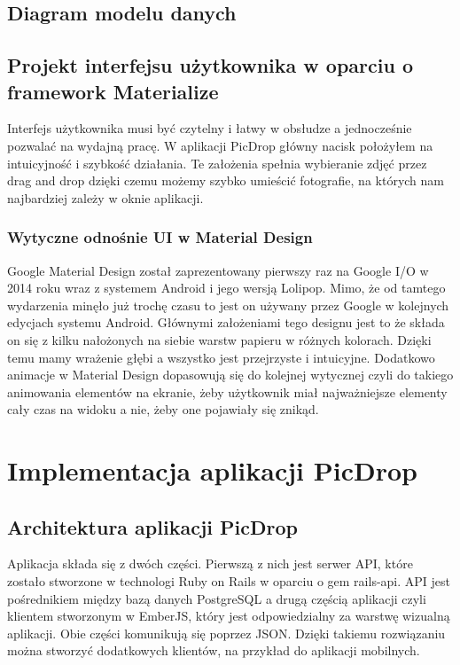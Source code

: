 \documentclass[brudnopis]{xmgr}
\begin{document}
\section{Diagram modelu danych}
\section{Projekt interfejsu użytkownika w oparciu o framework Materialize}
	Interfejs użytkownika musi być czytelny i łatwy w obsłudze a jednocześnie pozwalać na wydajną pracę. W aplikacji PicDrop główny nacisk położyłem na intuicyjność i szybkość działania. Te założenia spełnia wybieranie zdjęć przez drag and drop dzięki czemu możemy szybko umieścić fotografie, na których nam najbardziej zależy w oknie aplikacji.
\subsection{Wytyczne odnośnie UI w Material Design}
Google Material Design został zaprezentowany pierwszy raz na Google I/O w 2014 roku wraz z systemem Android i jego wersją Lolipop. Mimo, że od tamtego wydarzenia minęło już trochę czasu to jest on używany przez Google w kolejnych edycjach systemu Android. Głównymi założeniami tego designu jest to że składa on się z kilku  nałożonych na siebie warstw papieru w różnych kolorach. Dzięki temu mamy wrażenie głębi a wszystko jest przejrzyste i intuicyjne.
Dodatkowo animacje w Material Design dopasowują się do kolejnej wytycznej czyli do takiego animowania elementów na ekranie, żeby użytkownik miał najważniejsze elementy cały czas na widoku a nie, żeby one pojawiały się znikąd.

\chapter{Implementacja aplikacji PicDrop}
\section{Architektura aplikacji PicDrop}

Aplikacja składa się z dwóch części. Pierwszą z nich jest serwer API, które zostało stworzone w technologi Ruby on Rails w oparciu o gem rails-api. API jest pośrednikiem między bazą danych PostgreSQL a drugą częścią aplikacji czyli klientem stworzonym w EmberJS, który jest odpowiedzialny za warstwę wizualną aplikacji. Obie części komunikują się poprzez  JSON. Dzięki takiemu rozwiązaniu można stworzyć dodatkowych klientów, na przykład do aplikacji mobilnych.
\end{document}
